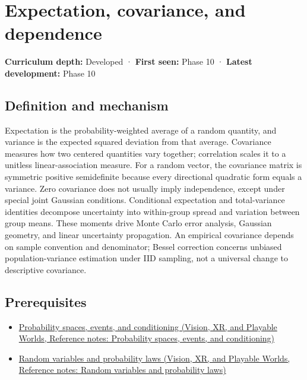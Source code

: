 \hypertarget{appendix-54c383df9992}{}\label{referencestart:appendix-54c383df9992}
\section{Expectation, covariance, and dependence}\label{appendix-54c383df9992-expectation-covariance-and-dependence}

\textbf{Curriculum depth:} Developed · \textbf{First seen:} Phase 10 · \textbf{Latest development:} Phase 10

\subsection{Definition and mechanism}\label{appendix-54c383df9992-definition-and-mechanism}

Expectation is the probability-weighted average of a random quantity, and variance is the expected squared deviation from that average. Covariance measures how two centered quantities vary together; correlation scales it to a unitless linear-association measure. For a random vector, the covariance matrix is symmetric positive semidefinite because every directional quadratic form equals a variance. Zero covariance does not usually imply independence, except under special joint Gaussian conditions. Conditional expectation and total-variance identities decompose uncertainty into within-group spread and variation between group means. These moments drive Monte Carlo error analysis, Gaussian geometry, and linear uncertainty propagation. An empirical covariance depends on sample convention and denominator; Bessel correction concerns unbiased population-variance estimation under IID sampling, not a universal change to descriptive covariance.

\subsection{Prerequisites}\label{appendix-54c383df9992-prerequisites}

\begin{itemize}
\tightlist
\item
  \href{../07-Vision-XR-and-Playable-Worlds/main.pdf\#nameddest=appendix-f1ef323f6ed7}{Probability spaces, events, and conditioning (Vision, XR, and Playable Worlds, Reference notes: Probability spaces, events, and conditioning)}
\item
  \href{../07-Vision-XR-and-Playable-Worlds/main.pdf\#nameddest=appendix-4d0203f7944f}{Random variables and probability laws (Vision, XR, and Playable Worlds, Reference notes: Random variables and probability laws)}
\end{itemize}

